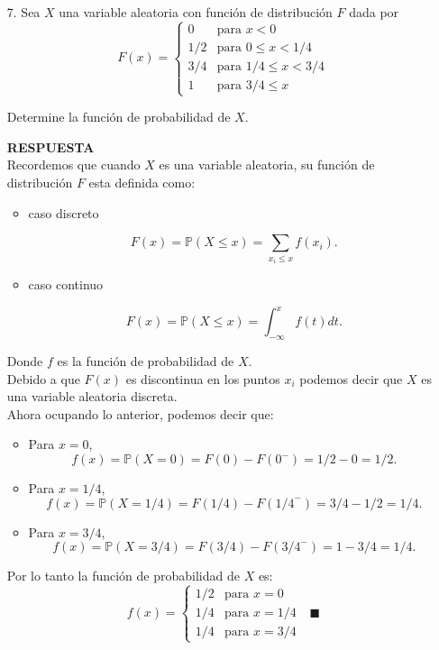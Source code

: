 \documentclass[11pt,letterpaper]{article}
\newcommand{\mP}{\mathbb{P}}
\newcommand{\res}{\textbf{RESPUESTA}\\}
\begin{document}
\begin{itemize}
\item[7.] Sea $X$ una variable aleatoria con función de distribución $F$ dada por
\begin{equation*}
F(x) = \left\{\begin{array}{ll}
0 & \text{para } x<0\\
1/2 & \text{para } 0 \leq x <1/4\\
3/4 & \text{para } 1/4\leq x< 3/4\\
1 & \text{para } 3/4 \leq x
\end{array} \right.
\end{equation*}

Determine la función de probabilidad de $X$.

\res 
Recordemos que cuando $X$ es una variable aleatoria, su función de distribución $F$ esta definida como:

\begin{itemize}
\item caso discreto

$$F(x) =\mP(X\leq x)= \sum_{x_i\leq x} f(x_i).$$

\item caso continuo

$$F(x) = \mP(X\leq x)= \int_{-\infty}^x f(t) dt.$$
\end{itemize}
Donde $f$ es la función de probabilidad de $X$. \\

Debido a que $F(x)$ es discontinua en los puntos $x_i$ podemos decir que $X$ es una variable aleatoria discreta.\\
Ahora ocupando lo anterior, podemos decir que:
\begin{itemize}
\item Para $x=0$,
$$ f(x)= \mP(X=0)= F(0)-F({0}^-)=1/2-0=1/2.$$

\item Para $x=1/4$,
$$ f(x)= \mP(X=1/4)= F(1/4)-F({1/4}^-)=3/4-1/2=1/4.$$

\item Para $x=3/4$,
$$ f(x)= \mP(X=3/4)= F(3/4)-F({3/4}^-)=1-3/4=1/4.$$
\end{itemize}
Por lo tanto la función de probabilidad de $X$ es: 
\begin{equation*}
f(x) = \left\{\begin{array}{ll}
1/2 & \text{para } x=0\\
1/4 & \text{para } x =1/4\\
1/4 & \text{para } x=3/4
\end{array} \right.\ \ \ \blacksquare
\end{equation*}


\end{itemize}
\end{document}
